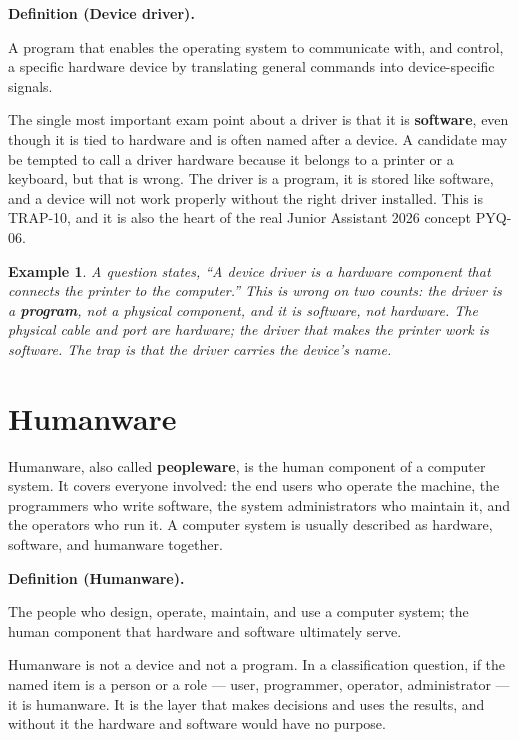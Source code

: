 \documentclass[11pt]{article}
\newtheorem{example}{Example}[section]
\newenvironment{definitionbox}[1]{%
  \par\noindent\textbf{Definition (#1).}\ \itshape
}{\par\vspace{0.3em}}
\begin{document}
\begin{definitionbox}{Device driver}
A program that enables the operating system to communicate with, and control,
a specific hardware device by translating general commands into
device-specific signals.
\end{definitionbox}

The single most important exam point about a driver is that it is
\textbf{software}, even though it is tied to hardware and is often named after
a device. A candidate may be tempted to call a driver hardware because it
belongs to a printer or a keyboard, but that is wrong. The driver is a program,
it is stored like software, and a device will not work properly without the
right driver installed. This is TRAP-10, and it is also the heart of the real
Junior Assistant 2026 concept PYQ-06.

\begin{example}
A question states, ``A device driver is a hardware component that connects the
printer to the computer.'' This is wrong on two counts: the driver is a
\textbf{program}, not a physical component, and it is software, not hardware.
The physical cable and port are hardware; the driver that makes the printer
work is software. The trap is that the driver carries the device's name.
\end{example}

\section{Humanware}
Humanware, also called \textbf{peopleware}, is the human component of a
computer system. It covers everyone involved: the end users who operate the
machine, the programmers who write software, the system administrators who
maintain it, and the operators who run it. A computer system is usually
described as hardware, software, and humanware together.

\begin{definitionbox}{Humanware}
The people who design, operate, maintain, and use a computer system; the human
component that hardware and software ultimately serve.
\end{definitionbox}

Humanware is not a device and not a program. In a classification question, if
the named item is a person or a role --- user, programmer, operator,
administrator --- it is humanware. It is the layer that makes decisions and
uses the results, and without it the hardware and software would have no
purpose.
\end{document}

